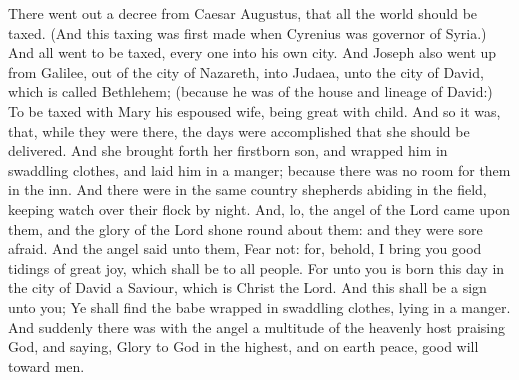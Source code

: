 
\vspace{-0.2\baselineskip}


\vspace{-0.1\baselineskip}

 There went out a decree from Caesar Augustus, that all the world should be taxed. (And this taxing was first made when Cyrenius was governor of Syria.) And all went to be taxed, every one into his own city. And Joseph also went up from Galilee, out of the city of Nazareth, into Judaea, unto the city of David, which is called Bethlehem; (because he was of the house and lineage of David:) To be taxed with Mary his espoused wife, being great with child. And so it was, that, while they were there, the days were accomplished that she should be delivered. And she brought forth her firstborn son, and wrapped him in swaddling clothes, and laid him in a manger; because there was no room for them in the inn. And there were in the same country shepherds abiding in the field, keeping watch over their flock by night. And, lo, the angel of the Lord came upon them, and the glory of the Lord shone round about them: and they were sore afraid. And the angel said unto them, Fear not: for, behold, I bring you good tidings of great joy, which shall be to all people. For unto you is born this day in the city of David a Saviour, which is Christ the Lord. And this shall be a sign unto you; Ye shall find the babe wrapped in swaddling clothes, lying in a manger. And suddenly there was with the angel a multitude of the heavenly host praising God, and saying, Glory to God in the highest, and on earth peace, good will toward men.


\vspace{-0.2\baselineskip}

\secret

\vspace{-0.1\baselineskip}

